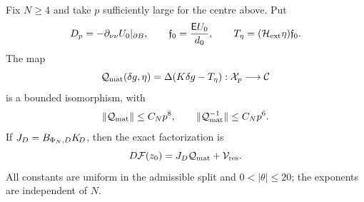 \begin{theorem}\label{inf:material-isomorphism}
Fix $N\ge4$ and take $p$ sufficiently large for the centre above.
Put
\begin{equation}\label{inf:material-definitions}
 D_p=-\partial_{\nu\nu}U_0|_{\partial B},\qquad
 \mathfrak f_0=\frac{\mathsf E U_0}{d_0},\qquad
 T_\eta=(\mathcal H_{\mathrm{ext}}\eta)\mathfrak f_0.
\end{equation}
The map
\begin{equation}\label{inf:Qmat-definition}
 \mathcal Q_{\mathrm{mat}}(\delta g,\eta)=\Delta(K\delta g-T_\eta)
                 :\mathcal X_p\longrightarrow\mathcal C
\end{equation}
is a bounded isomorphism, with
\begin{equation}\label{inf:Qmat-bounds}
 \lVert \mathcal Q_{\mathrm{mat}}\rVert\le C_Np^8,\qquad
 \lVert \mathcal Q_{\mathrm{mat}}^{-1}\rVert\le C_Np^6.
\end{equation}
If $J_D=B_{\Phi_N,D}K_{\!D}$, then the exact factorization is
\begin{equation}\label{inf:material-factorization}
 D\mathcal F(z_0)=J_D\mathcal Q_{\mathrm{mat}}+\mathcal V_{\mathrm{res}}.
\end{equation}
All constants are uniform in the admissible split and
$0<|\theta|\le20$; the exponents are independent of $N$.
\end{theorem}
